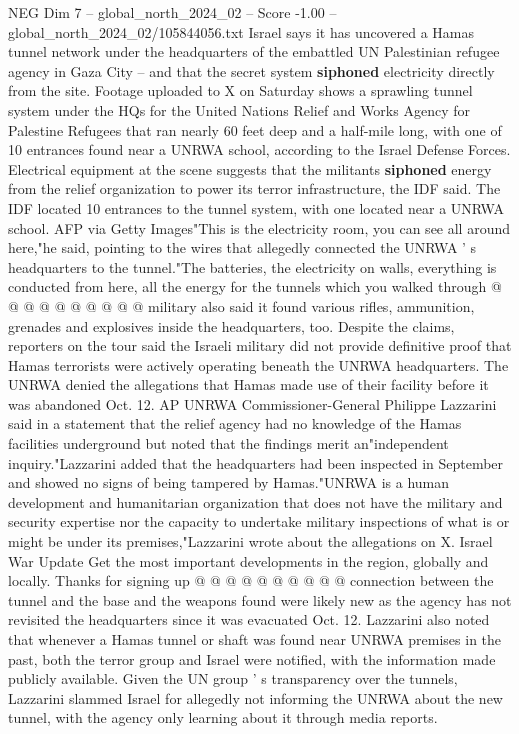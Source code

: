 \begin{textsample}{NEG Dim 7 – global\_north\_2024\_02 – Score -1.00 – global\_north\_2024\_02/105844056.txt}  \label{ex:f7_neg_430}
Israel says it has uncovered a Hamas tunnel network under the headquarters of the embattled UN Palestinian refugee agency in Gaza City -- and that the secret system \textbf{siphoned} electricity directly from the site.
Footage uploaded to X on Saturday shows a sprawling tunnel system under the HQs for the United Nations Relief and Works Agency for Palestine Refugees that ran nearly 60 feet deep and a half-mile long, with one of 10 entrances found near a UNRWA school, according to the Israel Defense Forces.
Electrical equipment at the scene suggests that the militants \textbf{siphoned} energy from the relief organization to power its terror infrastructure, the IDF said.
The IDF located 10 entrances to the tunnel system, with one located near a UNRWA school.
AFP via Getty Images"This is the electricity room, you can see all around here,"he said, pointing to the wires that allegedly connected the UNRWA ' s headquarters to the tunnel."The batteries, the electricity on walls, everything is conducted from here, all the energy for the tunnels which you walked through @ @ @ @ @ @ @ @ @ @ military also said it found various rifles, ammunition, grenades and explosives inside the headquarters, too.
Despite the claims, reporters on the tour said the Israeli military did not provide definitive proof that Hamas terrorists were actively operating beneath the UNRWA headquarters.
The UNRWA denied the allegations that Hamas made use of their facility before it was abandoned Oct. 12.
AP UNRWA Commissioner-General Philippe Lazzarini said in a statement that the relief agency had no knowledge of the Hamas facilities underground but noted that the findings merit an"independent inquiry."Lazzarini added that the headquarters had been inspected in September and showed no signs of being tampered by Hamas."UNRWA is a human development and humanitarian organization that does not have the military and security expertise nor the capacity to undertake military inspections of what is or might be under its premises,"Lazzarini wrote about the allegations on X.
Israel War Update Get the most important developments in the region, globally and locally.
Thanks for signing up @ @ @ @ @ @ @ @ @ @ connection between the tunnel and the base and the weapons found were likely new as the agency has not revisited the headquarters since it was evacuated Oct. 12.
Lazzarini also noted that whenever a Hamas tunnel or shaft was found near UNRWA premises in the past, both the terror group and Israel were notified, with the information made publicly available.
Given the UN group ' s transparency over the tunnels, Lazzarini slammed Israel for allegedly not informing the UNRWA about the new tunnel, with the agency only learning about it through media reports.

\end{textsample}

